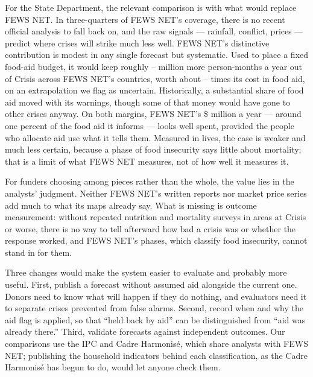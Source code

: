 \documentclass[11pt]{article}
\begin{document}
For the State Department, the relevant comparison is with what would replace FEWS NET. In three-quarters of FEWS NET's coverage, there is no recent official analysis to fall back on, and the raw signals --- rainfall, conflict, prices --- predict where crises will strike much less well. FEWS NET's distinctive contribution is modest in any single forecast but systematic. Used to place a fixed food-aid budget, it would keep roughly \vmHalfGainAll{}--\vmRandGainAll{} million more person-months a year out of Crisis across FEWS NET's countries, worth about \vmHalfRatioAll{}--\vmRandRatioAll{} times its cost in food aid, on an extrapolation we flag as uncertain. Historically, a substantial share of food aid moved with its warnings, though some of that money would have gone to other crises anyway. On both margins, FEWS NET's \$\bcBudget{} million a year --- around one percent of the food aid it informs --- looks well spent, provided the people who allocate aid use what it tells them. Measured in lives, the case is weaker and much less certain, because a phase of food insecurity says little about mortality; that is a limit of what FEWS NET measures, not of how well it measures it.

For funders choosing among pieces rather than the whole, the value lies in the analysts' judgment. Neither FEWS NET's written reports nor market price series add much to what its maps already say. What is missing is outcome measurement: without repeated nutrition and mortality surveys in areas at Crisis or worse, there is no way to tell afterward how bad a crisis was or whether the response worked, and FEWS NET's phases, which classify food insecurity, cannot stand in for them.

Three changes would make the system easier to evaluate and probably more useful. First, publish a forecast without assumed aid alongside the current one. Donors need to know what will happen if they do nothing, and evaluators need it to separate crises prevented from false alarms. Second, record when and why the aid flag is applied, so that ``held back by aid'' can be distinguished from ``aid was already there.'' Third, validate forecasts against independent outcomes. Our comparisons use the IPC and Cadre Harmonis\'e, which share analysts with FEWS NET; publishing the household indicators behind each classification, as the Cadre Harmonis\'e has begun to do, would let anyone check them.

\newpage


\end{document}
